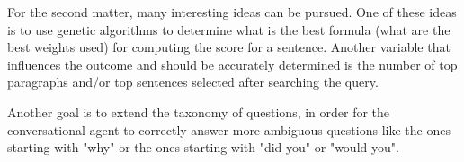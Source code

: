 For the second matter, many interesting ideas can be pursued. One of these ideas is to use genetic algorithms to determine what is the best formula (what are the best weights used) for computing the score for a sentence. Another variable that influences the outcome and should be accurately determined is the number of top paragraphs and/or top sentences selected after searching the query.

Another goal is to extend the taxonomy of questions, in order for the conversational agent to correctly answer more ambiguous questions like the ones starting with "why" or the ones starting with "did you" or "would you".
